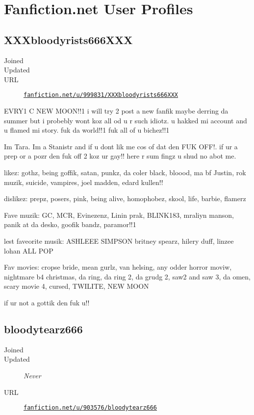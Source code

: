 \cleardoublepage\chapter{Fanfiction.net User Profiles}

\section{XXXbloodyrists666XXX}
\begin{description}
	\item[Joined] 
	\item[Updated] 
	\item[URL] \href{https://www.fanfiction.net/u/999831/XXXbloodyrists666XXX}{\texttt{fanfiction.net/u/999831/XXXbloodyrists666XXX}}
\end{description}

EVRY1 C NEW MOON!!1 i will try 2 post a new fanfik
maybe derring da summer but i probebly wont koz all
od u r such idiotz. u hakked mi account and u flamed
mi story. fuk da world!!1 fuk all of u bichez!!1

Im Tara. Im a Stanistr and if u dont lik me cos of
dat den FUK OFF!. if ur a prep or a pozr den fuk off
2 koz ur gay!! here r sum fingz u shud no abot me.

likez: gothz, being goffik, satan, punkz, da coler
black, bloood, ma bf Justin, rok muzik, suicide,
vampires, joel madden, edard kullen!!

dislikez: prepz, posers, pink, being alive,
homophobez, skool, life, barbie, flamerz

Fave muzik: GC, MCR, Evinezenz, Linin prak, BLINK183,
mraliyn manson, panik at da desko, goofik bandz, paramor!!1

\begin{sloppypar}
	lest faveorite musik: ASHLEEE SIMPSON britney spearz,
	hilery duff, linzee lohan ALL POP
\end{sloppypar}

Fav movies: cropse bride, mean gurlz, van helsing, any
odder horror moviw, nightmare b4 christmas, da ring,
da ring 2, da grudg 2, saw2 and saw 3, da omen, scary movie 4,
cursed, TWILITE, NEW MOON

if ur not a gottik den fuk u!!

\section{bloodytearz666}
\begin{description}
	\item[Joined] 
	\item[Updated] \textit{Never} %
	\item[URL] \href{https://www.fanfiction.net/u/903576/bloodytearz666}{\texttt{fanfiction.net/u/903576/bloodytearz666}}
\end{description}

